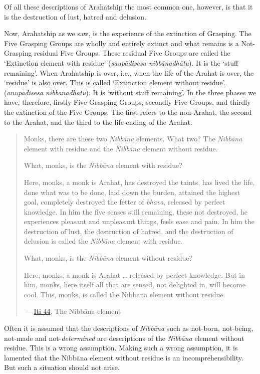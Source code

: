 Of all these descriptions of Arahatship the most common one, however, is that it is the destruction of lust, hatred and delusion.

\protect\hypertarget{remainder}{}{}Now, Arahatship as we saw, is the experience of the extinction of Grasping. The Five Grasping Groups are wholly and entirely extinct and what remains is a Not-Grasping residual Five Groups. These residual Five Groups are called the `Extinction element with residue' (\emph{saupādisesa nibbānadhātu}). It is the `stuff remaining'. When Arahatship is over, i.e., when the life of the Arahat is over, the `residue' is also over. This is called `Extinction element without residue'. (\emph{anupādisesa nibbānadhātu}). It is `without stuff remaining'. In the three phases we have, therefore, firstly Five Grasping Groups, secondly Five Groups, and thirdly the extinction of the Five Groups. The first refers to the non-Arahat, the second to the Arahat, and the third to the life-ending of the Arahat.

\begin{quote}
Monks, there are these two \emph{Nibbāna} elements. What two? The \emph{Nibbāna} element with residue and the \emph{Nibbāna} element without residue.

What, monks, is the \emph{Nibbāna} element with residue?

Here, monks, a monk is Arahat, has destroyed the taints, has lived the life, done what was to be done, laid down the burden, attained the highest goal, completely destroyed the fetter of \emph{bhava}, released by perfect knowledge. In him the five senses still remaining, these not destroyed, he experiences pleasant and unpleasant things, feels ease and pain. In him the destruction of lust, the destruction of hatred, and the destruction of delusion is called the \emph{Nibbāna} element with residue.

What, monks, is the \emph{Nibbāna} element without residue?

Here, monks, a monk is Arahat \ldots\hspace{0pt} released by perfect knowledge. But in him, monks, here itself all that are sensed, not delighted in, will become cool. This, monks, is called the Nibbāna element without residue.

 --- \href{https://suttacentral.net/iti44/en/ireland}{Iti 44}, The Nibbāna-element
\end{quote}

Often it is assumed that the descriptions of \emph{Nibbāna} such as not-born, not-being, not-made and not-\emph{determined} are descriptions of the \emph{Nibbāna} element without residue. This is a wrong assumption. Making such a wrong assumption, it is lamented that the Nibbāna element without residue is an incomprehensibility. But such a situation should not arise.

